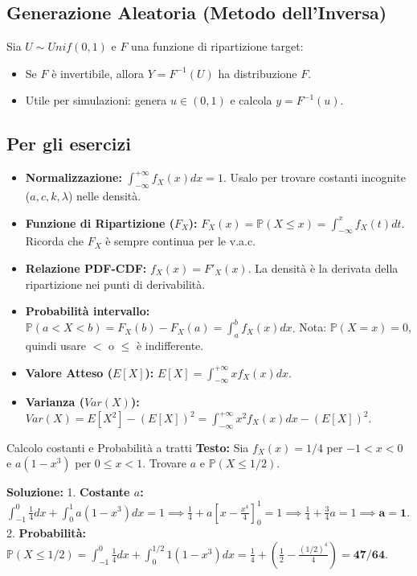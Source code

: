 \documentclass[12pt]{extarticle} %
\begin{document}
\subsection{Generazione Aleatoria (Metodo dell'Inversa)}
Sia $U \sim Unif(0, 1)$ e $F$ una funzione di ripartizione target:
\begin{itemize}
    \item Se $F$ è invertibile, allora $Y = F^{-1}(U)$ ha distribuzione $F$.
    \item Utile per simulazioni: genera $u \in (0,1)$ e calcola $y = F^{-1}(u)$.
\end{itemize}

\newpage

\subsection{Per gli esercizi}
\begin{itemize}
    \item \textbf{Normalizzazione:} $\int_{-\infty}^{+\infty} f_X(x) dx = 1$. {\footnotesize Usalo per trovare costanti incognite ($a, c, k, \lambda$) nelle densità.}
    \item \textbf{Funzione di Ripartizione ($F_X$):} $F_X(x) = \mathbb{P}(X \le x) = \int_{-\infty}^{x} f_X(t) dt$. {\footnotesize Ricorda che $F_X$ è sempre continua per le v.a.c.}
    \item \textbf{Relazione PDF-CDF:} $f_X(x) = F'_X(x)$. {\footnotesize La densità è la derivata della ripartizione nei punti di derivabilità.}
    \item \textbf{Probabilità intervallo:} $\mathbb{P}(a < X < b) = F_X(b) - F_X(a) = \int_{a}^{b} f_X(x) dx$. {\footnotesize Nota: $\mathbb{P}(X=x) = 0$, quindi usare $<$ o $\le$ è indifferente.}
    \item \textbf{Valore Atteso ($E[X]$):} $E[X] = \int_{-\infty}^{+\infty} x f_X(x) dx$.
    \item \textbf{Varianza ($Var(X)$):} $Var(X) = E[X^2] - (E[X])^2 = \int_{-\infty}^{+\infty} x^2 f_X(x) dx - (E[X])^2$.
\end{itemize}

\begin{eserciziobox}{Calcolo costanti e Probabilità a tratti}
\textbf{Testo:} Sia $f_X(x) = 1/4$ per $-1 < x < 0$ e $a(1-x^3)$ per $0 \le x < 1$. Trovare $a$ e $\mathbb{P}(X \le 1/2)$.
\par\textbf{Soluzione:}
1. \textbf{Costante $a$:} $\int_{-1}^{0} \frac{1}{4} dx + \int_{0}^{1} a(1-x^3) dx = 1 \implies \frac{1}{4} + a[x - \frac{x^4}{4}]_0^1 = 1 \implies \frac{1}{4} + \frac{3}{4}a = 1 \implies \mathbf{a=1}$.
2. \textbf{Probabilità:} $\mathbb{P}(X \le 1/2) = \int_{-1}^{0} \frac{1}{4} dx + \int_{0}^{1/2} 1(1-x^3) dx = \frac{1}{4} + (\frac{1}{2} - \frac{(1/2)^4}{4}) = \mathbf{47/64}$.
\end{eserciziobox}
\end{document}

